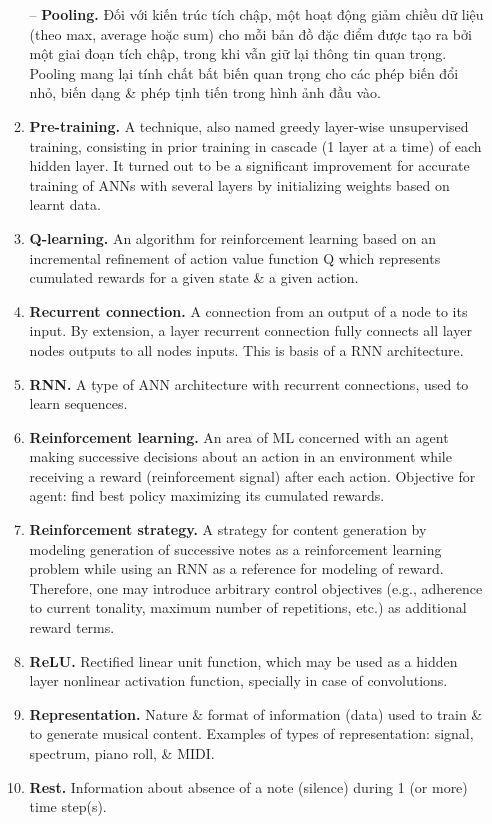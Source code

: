 \documentclass{article}
\begin{document}
\begin{itemize}
\begin{enumerate}
		-- {\bf Pooling.} Đối với kiến trúc tích chập, một hoạt động giảm chiều dữ liệu (theo max, average hoặc sum) cho mỗi bản đồ đặc điểm được tạo ra bởi một giai đoạn tích chập, trong khi vẫn giữ lại thông tin quan trọng. Pooling mang lại tính chất bất biến quan trọng cho các phép biến đổi nhỏ, biến dạng \& phép tịnh tiến trong hình ảnh đầu vào.
		\item {\bf Pre-training.} A technique, also named greedy layer-wise unsupervised training, consisting in prior training in cascade (1 layer at a time) of each hidden layer. It turned out to be a significant improvement for accurate training of ANNs with several layers by initializing weights based on learnt data.
		\item {\bf Q-learning.} An algorithm for reinforcement learning based on an incremental refinement of action value function Q which represents cumulated rewards for a given state \& a given action.
		\item {\bf Recurrent connection.} A connection from an output of a node to its input. By extension, a layer recurrent connection fully connects all layer nodes outputs to all nodes inputs. This is basis of a RNN architecture.
		\item {\bf RNN.} A type of ANN architecture with recurrent connections, used to learn sequences.
		\item {\bf Reinforcement learning.} An area of ML concerned with an agent making successive decisions about an action in an environment while receiving a reward (reinforcement signal) after each action. Objective for agent: find best policy maximizing its cumulated rewards.
		\item {\bf Reinforcement strategy.} A strategy for content generation by modeling generation of successive notes as a reinforcement learning problem while using an RNN as a reference for modeling of reward. Therefore, one may introduce arbitrary control objectives (e.g., adherence to current tonality, maximum number of repetitions, etc.) as additional reward terms.
		\item {\bf ReLU.} Rectified linear unit function, which may be used as a hidden layer nonlinear activation function, specially in case of convolutions.
		\item {\bf Representation.} Nature \& format of information (data) used to train \& to generate musical content. Examples of types of representation: signal, spectrum, piano roll, \& MIDI.
		\item {\bf Rest.} Information about absence of a note (silence) during 1 (or more) time step(s).

\end{enumerate}
\end{itemize}
\end{document}
